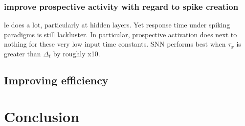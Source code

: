 \subsubsection{improve prospective activity with regard to spike creation}

le does a lot, particularly at hidden layers. Yet response time under spiking paradigms is still
lackluster. In particular, prospective activation does next to nothing for these very low input time
constants. SNN performs best when $\tau_x$ is greater than $\Delta_t$ by roughly x10.





\subsection{Improving efficiency}




\section{Conclusion}